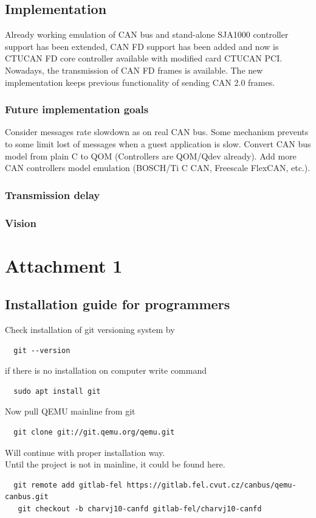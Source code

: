 \documentclass{ctuthesis}
\begin{document}
 \section{Implementation}
  Already working emulation of CAN bus and stand-alone SJA1000 controller support has been extended, CAN FD support has been added and now is CTUCAN FD core controller available with modified card CTUCAN PCI. Nowadays, the transmission of CAN FD frames is available. The new implementation keeps previous functionality of sending CAN 2.0 frames.

 \subsection{Future implementation goals}
  Consider messages rate slowdown as on real CAN bus. Some mechanism prevents to some limit lost of messages when a guest application is slow. Convert CAN bus model from plain C to QOM (Controllers are QOM/Qdev already). Add more CAN controllers model emulation (BOSCH/Ti C CAN, Freescale FlexCAN, etc.).
 
 \subsection{Transmission delay}
 
 \subsection{Vision}

\chapter{Attachment 1}
 
 \section{Installation guide for programmers}
  Check installation of git versioning system by
  \begin{verbatim}  git --version\end{verbatim}
  if there is no installation on computer write command
  \begin{verbatim}  sudo apt install git\end{verbatim}
  Now pull QEMU mainline from git
 \begin{verbatim}  git clone git://git.qemu.org/qemu.git\end{verbatim}
  Will continue with proper installation way. \\
  Until the project is not in mainline, it could be found here.
  \begin{verbatim}  git remote add gitlab-fel https://gitlab.fel.cvut.cz/canbus/qemu-canbus.git
   git checkout -b charvj10-canfd gitlab-fel/charvj10-canfd\end{verbatim}
\end{document}
